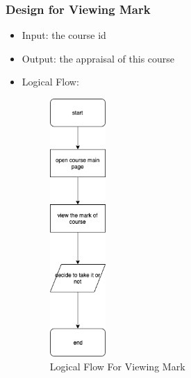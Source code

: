 \documentclass[16pt]{scrreprt}
\begin{document}
\subsubsection{Design for Viewing Mark}
\begin{itemize}
    \item Input: the course id
    \item Output: the appraisal of this course
    \item Logical Flow:
    \begin{figure}[H]
        \centering
        \includegraphics[width=0.2\textwidth]{diagrams/flow-ViewMark.png}
        \caption{Logical Flow For Viewing Mark}
    \end{figure}
\end{itemize}
\end{document}
